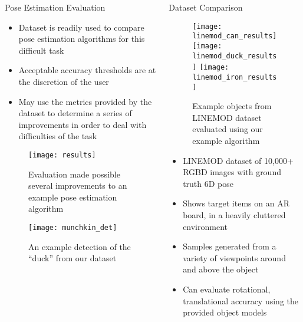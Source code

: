 \begin{columns}[t]
	\begin{column}{0.32\textwidth}
		\begin{block}{\large Pose Estimation Evaluation}
			\centering
			\begin{itemize}
				\item Dataset is readily used to compare pose estimation algorithms for this difficult task 
				\item Acceptable accuracy thresholds are at the discretion of the user
				\item May use the metrics provided by the dataset to determine a series of improvements in order to deal with difficulties of the task
			\end{itemize}
				\begin{figure}[h]
					\texttt{[image: results]}
					\caption{Evaluation made possible several improvements to an example pose estimation algorithm }
				\end{figure}
				\begin{figure}[h]
					\texttt{[image: munchkin\_det]}
					\caption {An example detection of the ``duck'' from our dataset}
				\end{figure}
		\end{block}
	\end{column}
	\begin{column}{0.68\textwidth}
		\begin{block}{\large Dataset Comparison}
			\centering
			\vspace{-0.2in}
				\begin{figure}[h]
					\texttt{[image: linemod\_can\_results]}
					\texttt{[image: linemod\_duck\_results]}
					\texttt{[image: linemod\_iron\_results]}
					\vspace{-0.2in}
					\caption{Example objects from LINEMOD dataset evaluated using our example algorithm}
				\end{figure}
			\vspace{-0.2in}
			\begin{itemize}
				\item LINEMOD dataset of 10,000+ RGBD images with ground truth 6D pose
				\item Shows target items on an AR board, in a heavily cluttered environment
				\item Samples generated from a variety of viewpoints around and above the object
				\item Can evaluate rotational, translational accuracy using the provided object models 

\end{itemize}
\end{block}
\end{column}
\end{columns}

